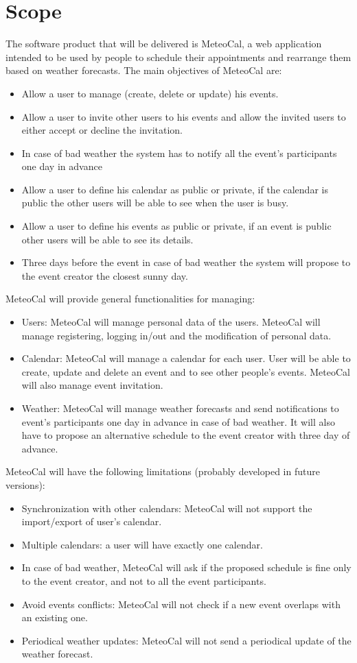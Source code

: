 \documentclass[10pt,a4paper,titlepage]{article}
\begin{document}
\section{Scope}
The software product that will be delivered is MeteoCal, a web application intended to be used by people to schedule their appointments and rearrange them based on weather forecasts.
The main objectives of MeteoCal are:
\begin{itemize}
\item Allow a user to manage (create, delete or update) his events.
\item Allow a user to invite other users to his events and allow the invited users to either accept or decline the invitation.
\item In case of bad weather the system has to notify all the event's participants one day in advance
\item Allow a user to define his calendar as public or private, if the calendar is public the other users will be able to see when the user is busy.
\item Allow a user to define his events as public or private, if an event is public other users will be able to see its details.
\item Three days before the event in case of bad weather the system will propose to the event creator the closest sunny day.
\end{itemize}
MeteoCal will provide general functionalities for managing:
\begin{itemize}
\item Users: MeteoCal will manage personal data of the users. MeteoCal will manage registering, logging in/out and the modification of personal data.
\item Calendar: MeteoCal will manage a calendar for each user. User will be able to create, update and delete an event and to see other people's events. MeteoCal will also manage event invitation.
\item Weather: MeteoCal will manage weather forecasts and send notifications to event's participants one day in advance in case of bad weather. It will also have to propose an alternative schedule to the event creator with three day of advance.
\end{itemize}
MeteoCal will have the following limitations (probably developed in future versions):
\begin{itemize}
\item Synchronization with other calendars: MeteoCal will not support the import/export of user's calendar.
\item Multiple calendars: a user will have exactly one calendar.
\item In case of bad weather, MeteoCal will ask if the proposed schedule is fine only to the event creator, and not to all the event participants.
\item Avoid events conflicts: MeteoCal will not check if a new event overlaps with an existing one.
\item Periodical weather updates: MeteoCal will not send a periodical update of the weather forecast.
\end{itemize}
\end{document}
